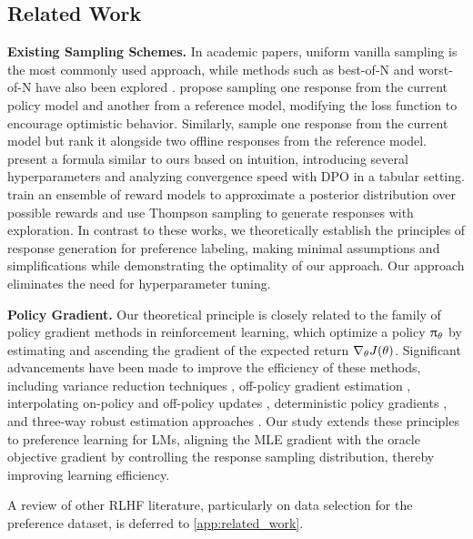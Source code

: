 \vspace{-3pt}
\subsection{Related Work}


\textbf{Existing Sampling Schemes.} In academic papers, uniform vanilla sampling is the most commonly used approach, while methods such as best-of-N and worst-of-N have also been explored \citep{dong2024rlhf}. \citet{xie2024exploratory} propose sampling one response from the current policy model and another from a reference model, modifying the loss function to encourage optimistic behavior. Similarly, \citet{zhang2024self} sample one response from the current model but rank it alongside two offline responses from the reference model. \citet{shi2024crucial} present a formula similar to ours based on intuition, introducing several hyperparameters and analyzing convergence speed with DPO in a tabular setting. {\citet{liu2024sample} train an ensemble of reward models to approximate a posterior distribution over possible rewards and use Thompson sampling to generate responses with exploration.} In contrast to these works, we theoretically establish the principles of response generation for preference labeling, making minimal assumptions and simplifications while demonstrating the optimality of our approach. Our approach eliminates the need for hyperparameter tuning. 


\textbf{Policy Gradient.} Our theoretical principle is closely related to the family of policy gradient methods \citep{williams1992simple,sutton1999policy} in reinforcement learning, which optimize a policy $\uppi_{\theta}$ by estimating and ascending the gradient of the expected return $\nabla_{\theta} J(\theta)$. 
Significant advancements have been made to improve the efficiency of these methods, including variance reduction techniques \citep{greensmith2004variance}, off-policy gradient estimation \citep{degris2012off}, interpolating on-policy and off-policy updates \citep{gu2017interpolated}, deterministic policy gradients \citep{silver2014deterministic}, and three-way robust estimation approaches \citep{kallus2020statistically}. 
Our study extends these principles to preference learning for LMs, aligning the MLE gradient with the oracle objective gradient by controlling the response sampling distribution, thereby improving learning efficiency. 

A review of other RLHF literature, particularly on data selection for the preference dataset, is deferred to \cref{app:related_work}.






